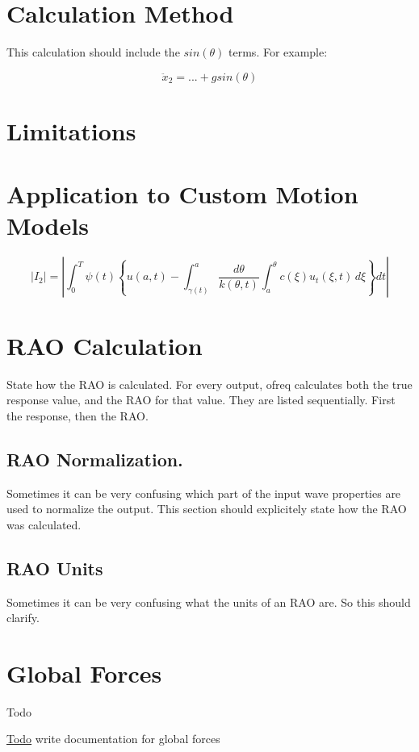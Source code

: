 \section*{Calculation Method}

This calculation should include the $ sin(\theta)$ terms. For example\-:

\[ \ddot x_2 = ... + g sin \left ( \theta \right ) \]

\section*{Limitations}

\section*{Application to Custom Motion Models}

\[ |I_2|=\left| \int_{0}^T \psi(t) \left\{ u(a,t)- \int_{\gamma(t)}^a \frac{d\theta}{k(\theta,t)} \int_{a}^\theta c(\xi)u_t(\xi,t)\,d\xi \right\} dt \right| \]

\section*{R\-A\-O Calculation}

State how the R\-A\-O is calculated. For every output, ofreq calculates both the true response value, and the R\-A\-O for that value. They are listed sequentially. First the response, then the R\-A\-O.

\subsection*{R\-A\-O Normalization.}

Sometimes it can be very confusing which part of the input wave properties are used to normalize the output. This section should explicitely state how the R\-A\-O was calculated.

\subsection*{R\-A\-O Units}

Sometimes it can be very confusing what the units of an R\-A\-O are. So this should clarify. \hypertarget{global_force}{}\section{Global Forces}\label{global_force}
\begin{DoxyRefDesc}{Todo}
\item[\hyperlink{todo__todo000014}{Todo}]write documentation for global forces\end{DoxyRefDesc}


